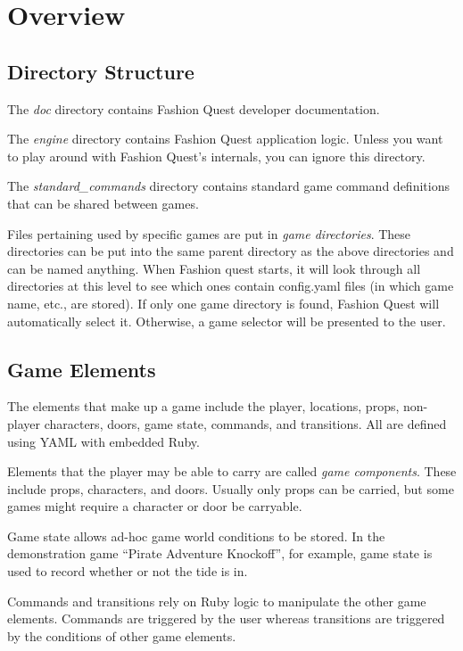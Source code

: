 \documentclass[letterpaper,10pt,english]{manual}
\begin{document}
\resetcurrentobjects
\hypertarget{--doc-overview}{}

\chapter{Overview}


\section{Directory Structure}

The \emph{doc} directory contains Fashion Quest developer documentation.

The \emph{engine} directory contains Fashion Quest application logic. Unless you want to play around with Fashion Quest's internals, you can ignore this directory.

The \emph{standard\_commands} directory contains standard game command definitions that can be shared between games.

Files pertaining used by specific games are put in \emph{game directories}. These directories can be put into the same parent directory as the above directories and can be named anything. When Fashion quest starts, it will look through all directories at this level to see which ones contain config.yaml files (in which game name, etc., are stored). If only one game directory is found, Fashion Quest will automatically select it. Otherwise, a game selector will be presented to the user.


\section{Game Elements}

The elements that make up a game include the player, locations, props, non-player characters, doors, game state, commands, and transitions. All are defined using YAML with embedded Ruby.

Elements that the player may be able to carry are called \emph{game components}. These include props, characters, and doors. Usually only props can be carried, but some games might require a character or door be carryable.

Game state allows ad-hoc game world conditions to be stored. In the demonstration game ``Pirate Adventure Knockoff'', for example, game state is used to record whether or not the tide is in.

Commands and transitions rely on Ruby logic to manipulate the other game elements. Commands are triggered by the user whereas transitions are triggered by the conditions of other game elements.
\end{document}
